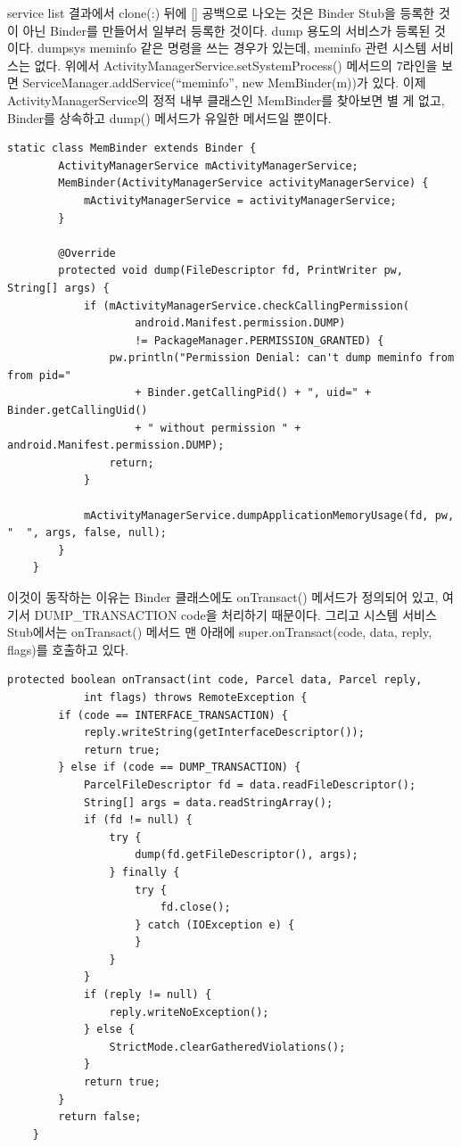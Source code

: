 service list 결과에서 clone(:) 뒤에 [] 공백으로 나오는 것은 Binder Stub을 등록한 것이 아닌 Binder를 만들어서 일부러 등록한 것이다. dump 용도의 서비스가 등록된 것이다.
dumpsys meminfo 같은 명령을 쓰는 경우가 있는데, meminfo 관련 시스템 서비스는 없다. 위에서 ActivityManagerService.setSystemProcess() 메서드의 7라인을 보면 ServiceManager.addService(``meminfo'', new MemBinder(m))가 있다.
이제 ActivityManagerService의 정적 내부 클래스인 MemBinder를 찾아보면 별 게 없고, Binder를 상속하고 dump() 메서드가 유일한 메서드일 뿐이다.
\begin{lstlisting}[frame=single]
    static class MemBinder extends Binder {
        ActivityManagerService mActivityManagerService;
        MemBinder(ActivityManagerService activityManagerService) {
            mActivityManagerService = activityManagerService;
        }

        @Override
        protected void dump(FileDescriptor fd, PrintWriter pw, String[] args) {
            if (mActivityManagerService.checkCallingPermission(
            		android.Manifest.permission.DUMP)
                    != PackageManager.PERMISSION_GRANTED) {
                pw.println("Permission Denial: can't dump meminfo from from pid="
                	+ Binder.getCallingPid() + ", uid=" + Binder.getCallingUid()
                    + " without permission " + android.Manifest.permission.DUMP);
                return;
            }

            mActivityManagerService.dumpApplicationMemoryUsage(fd, pw, "  ", args, false, null);
        }
    }
\end{lstlisting}
이것이 동작하는 이유는 Binder 클래스에도 onTransact() 메서드가 정의되어 있고,
여기서 DUMP\_TRANSAC\-TION code을 처리하기 때문이다.
그리고 시스템 서비스 Stub에서는 onTransact() 메서드 맨 아래에 super.onTransact(code, data, reply, flags)를 호출하고 있다.

\begin{lstlisting}[frame=single]
   protected boolean onTransact(int code, Parcel data, Parcel reply,
            int flags) throws RemoteException {
        if (code == INTERFACE_TRANSACTION) {
            reply.writeString(getInterfaceDescriptor());
            return true;
        } else if (code == DUMP_TRANSACTION) {
            ParcelFileDescriptor fd = data.readFileDescriptor();
            String[] args = data.readStringArray();
            if (fd != null) {
                try {
                    dump(fd.getFileDescriptor(), args);
                } finally {
                    try {
                        fd.close();
                    } catch (IOException e) {
                    }
                }
            }
            if (reply != null) {
                reply.writeNoException();
            } else {
                StrictMode.clearGatheredViolations();
            }
            return true;
        }
        return false;
    }
\end{lstlisting}

